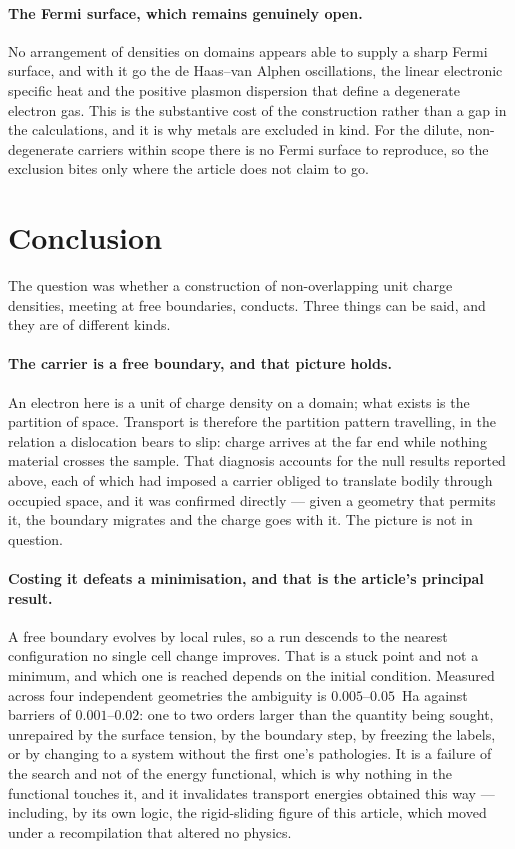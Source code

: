 \documentclass[11pt]{article}
\begin{document}
\paragraph{The Fermi surface, which remains genuinely open.} No arrangement of densities on domains
appears able to supply a sharp Fermi surface, and with it go the de Haas--van Alphen oscillations, the
linear electronic specific heat and the positive plasmon dispersion that define a degenerate electron
gas. This is the substantive cost of the construction rather than a gap in the calculations, and it
is why metals are excluded in kind. For the dilute, non-degenerate carriers within scope there is no
Fermi surface to reproduce, so the exclusion bites only where the article does not claim to go.

\section{Conclusion}\label{sec:conclusion}

The question was whether a construction of non-overlapping unit charge densities, meeting at free
boundaries, conducts. Three things can be said, and they are of different kinds.

\paragraph{The carrier is a free boundary, and that picture holds.} An electron here is a unit of
charge density on a domain; what exists is the partition of space. Transport is therefore the
partition pattern travelling, in the relation a dislocation bears to slip: charge arrives at the far
end while nothing material crosses the sample. That diagnosis accounts for the null results reported
above, each of which had imposed a carrier obliged to translate bodily through occupied space, and
it was confirmed directly --- given a geometry that permits it, the boundary migrates and the charge
goes with it. The picture is not in question.

\paragraph{Costing it defeats a minimisation, and that is the article's principal result.} A free
boundary evolves by local rules, so a run descends to the nearest configuration no single cell
change improves. That is a stuck point and not a minimum, and which one is reached depends on the
initial condition. Measured across four independent geometries the ambiguity is $0.005$--$0.05$~Ha
against barriers of $0.001$--$0.02$: one to two orders larger than the quantity being sought,
unrepaired by the surface tension, by the boundary step, by freezing the labels, or by changing to a
system without the first one's pathologies. It is a failure of the search and not of the energy
functional, which is why nothing in the functional touches it, and it invalidates transport energies
obtained this way --- including, by its own logic, the rigid-sliding figure of this article, which
moved under a recompilation that altered no physics.
\end{document}
